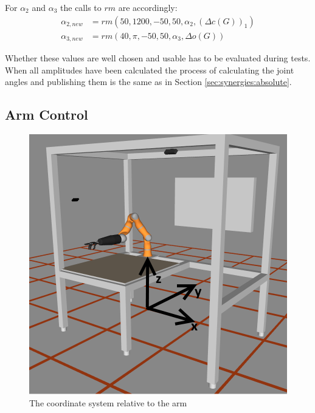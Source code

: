 For $\alpha_2$ and $\alpha_3$ the calls to $rm$ are accordingly:
\begin{align*}
\alpha_{2,new} &= rm(50, 1200, -50, 50, \alpha_2, (\Delta c(G))_1) \\
\alpha_{3,new} &= rm(40, \pi, -50, 50, \alpha_3, \Delta o(G))
\end{align*}

Whether these values are well chosen and usable has to be evaluated during tests. When all amplitudes have been calculated the process of calculating the joint angles and publishing them is the same as in Section \ref{sec:synergies:absolute}.

\subsection{Arm Control}

\begin{figure}
\caption{\label{fig:arm:coord}The coordinate system relative to the arm}
\includegraphics[width=\linewidth]{assets/chpt_concepts/coordinates.png}
\end{figure}

